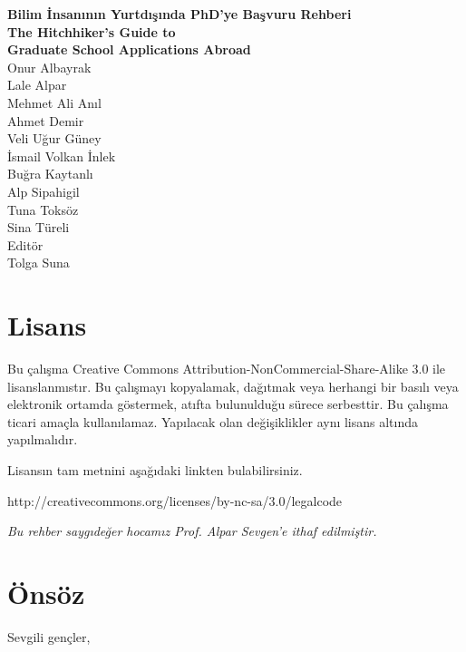 \documentclass[12pt]{article}
\theoremstyle{break}
\begin{document}
%
%
\thispagestyle{empty}
\setcounter{page}{0}
\begin{center}
\textbf{\Huge{Bilim İnsanının Yurtdışında PhD'ye Başvuru Rehberi} \\
\vspace{8mm}
\Large{The Hitchhiker's Guide to \\ 
\vspace{4mm}
Graduate School Applications Abroad}}\\

\vfill
\Large{Onur Albayrak} 
\\
Lale Alpar
\\
Mehmet Ali Anıl
\\
Ahmet Demir
\\
Veli Uğur Güney 
\\
İsmail Volkan İnlek
\\
Buğra Kaytanlı 
\\
Alp Sipahigil 
\\
Tuna Toksöz 
\\
Sina Türeli 
\\
\vspace{8mm}
\large{
Editör 
\\
Tolga Suna }
\end{center}
%
%
\newpage
\section*{Lisans}

Bu çalışma Creative Commons Attribution-NonCommercial-Share-Alike 3.0 ile lisanslanmıstır. Bu çalışmayı kopyalamak, dağıtmak veya herhangi bir basılı veya elektronik ortamda göstermek, atıfta bulunulduğu sürece serbesttir. Bu çalışma ticari amaçla kullanılamaz. Yapılacak olan değişiklikler aynı lisans altında yapılmalıdır. 

Lisansın tam metnini aşağıdaki linkten bulabilirsiniz.

http://creativecommons.org/licenses/by-nc-sa/3.0/legalcode

\byncsa
\newpage
%
%
\vspace*{45mm} 
\textit{Bu rehber saygıdeğer hocamız Prof. Alpar Sevgen'e ithaf edilmiştir.}
%
\newpage
%
%
\tableofcontents
%
\newpage

%
%
\section{Önsöz}
Sevgili gençler,
\end{document}
